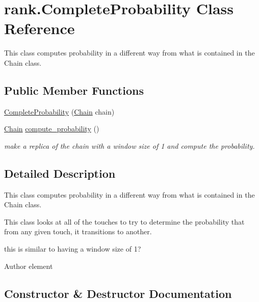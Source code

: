 \hypertarget{classrank_1_1_complete_probability}{}\section{rank.\+Complete\+Probability Class Reference}
\label{classrank_1_1_complete_probability}


This class computes probability in a different way from what is contained in the Chain class.  


\subsection*{Public Member Functions}
\begin{DoxyCompactItemize}
\item 
\hyperlink{classrank_1_1_complete_probability_a0c57b2805fa39cdc190edbba9ea5a86c}{Complete\+Probability} (\hyperlink{classcomponents_1_1_chain}{Chain} chain)
\item 
\hyperlink{classcomponents_1_1_chain}{Chain} \hyperlink{classrank_1_1_complete_probability_a1507b6695918da300c0130ccdc218900}{compute\+\_\+probability} ()
\begin{DoxyCompactList}\small\item\em make a replica of the chain with a window size of 1 and compute the probability. \end{DoxyCompactList}\end{DoxyCompactItemize}


\subsection{Detailed Description}
This class computes probability in a different way from what is contained in the Chain class. 

This class looks at all of the touches to try to determine the probability that from any given touch, it transitions to another.

this is similar to having a window size of 1?

\begin{DoxyAuthor}{Author}
element 
\end{DoxyAuthor}


\subsection{Constructor \& Destructor Documentation}
